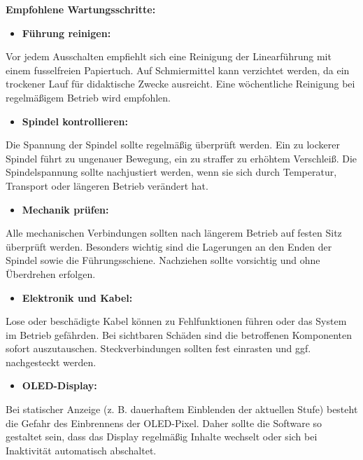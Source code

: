\documentclass[a4paper,12pt]{report}
\begin{document}
\textbf{Empfohlene Wartungsschritte:}

\setlength{\leftskip}{1.5em} 

\begin{itemize}[leftmargin=1.5em]
	\item \textbf{Führung reinigen:} 
\end{itemize}
Vor jedem Ausschalten empfiehlt sich eine Reinigung der Linearführung mit einem fusselfreien Papiertuch. Auf Schmiermittel kann verzichtet werden, da ein trockener Lauf für didaktische Zwecke ausreicht. Eine wöchentliche Reinigung bei regelmäßigem Betrieb wird empfohlen.

\begin{itemize}[leftmargin=1.5em]		
	\item \textbf{Spindel kontrollieren:} 
\end{itemize}
Die Spannung der Spindel sollte regelmäßig überprüft werden. Ein zu lockerer Spindel führt zu ungenauer Bewegung, ein zu straffer zu erhöhtem Verschleiß. Die Spindelspannung sollte nachjustiert werden, wenn sie sich durch Temperatur, Transport oder längeren Betrieb verändert hat. 

\begin{itemize}[leftmargin=1.5em]		
	\item \textbf{Mechanik prüfen:}  
\end{itemize}
Alle mechanischen Verbindungen sollten nach längerem Betrieb auf festen Sitz überprüft werden. Besonders wichtig sind die Lagerungen an den Enden der Spindel sowie die Führungsschiene. Nachziehen sollte vorsichtig und ohne Überdrehen erfolgen.

\begin{itemize}[leftmargin=1.5em]		
	\item \textbf{Elektronik und Kabel:}  
\end{itemize}
Lose oder beschädigte Kabel können zu Fehlfunktionen führen oder das System im Betrieb gefährden. Bei sichtbaren Schäden sind die betroffenen Komponenten sofort auszutauschen. Steckverbindungen sollten fest einrasten und ggf. nachgesteckt werden.

\begin{itemize}[leftmargin=1.5em]		
	\item \textbf{OLED-Display:}  
\end{itemize}
Bei statischer Anzeige (z. B. dauerhaftem Einblenden der aktuellen Stufe) besteht die Gefahr des Einbrennens der OLED-Pixel. Daher sollte die Software so gestaltet sein, dass das Display regelmäßig Inhalte wechselt oder sich bei Inaktivität automatisch abschaltet.
\end{document}
